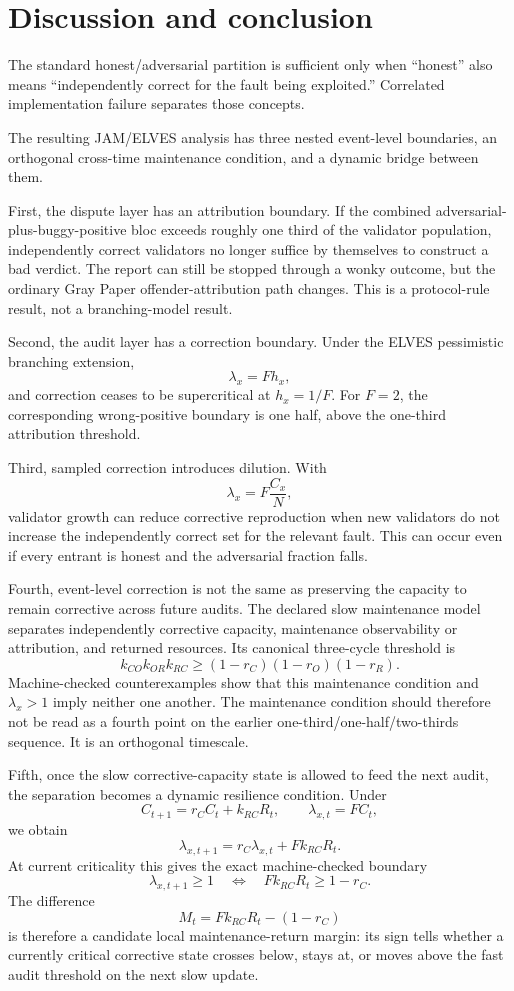 \section{Discussion and conclusion}

The standard honest/adversarial partition is sufficient only when ``honest'' also means ``independently correct for the fault being exploited.'' Correlated implementation failure separates those concepts.

The resulting JAM/ELVES analysis has three nested event-level boundaries, an orthogonal cross-time maintenance condition, and a dynamic bridge between them.

First, the dispute layer has an attribution boundary. If the combined adversarial-plus-buggy-positive bloc exceeds roughly one third of the validator population, independently correct validators no longer suffice by themselves to construct a bad verdict. The report can still be stopped through a wonky outcome, but the ordinary Gray Paper offender-attribution path changes. This is a protocol-rule result, not a branching-model result.

Second, the audit layer has a correction boundary. Under the ELVES pessimistic branching extension,
\[
\lambda_x=Fh_x,
\]
and correction ceases to be supercritical at \(h_x=1/F\). For \(F=2\), the corresponding wrong-positive boundary is one half, above the one-third attribution threshold.

Third, sampled correction introduces dilution. With
\[
\lambda_x=F\frac{C_x}{N},
\]
validator growth can reduce corrective reproduction when new validators do not increase the independently correct set for the relevant fault. This can occur even if every entrant is honest and the adversarial fraction falls.

Fourth, event-level correction is not the same as preserving the capacity to remain corrective across future audits. The declared slow maintenance model separates independently corrective capacity, maintenance observability or attribution, and returned resources. Its canonical three-cycle threshold is
\[
k_{CO}k_{OR}k_{RC}\ge(1-r_C)(1-r_O)(1-r_R).
\]
Machine-checked counterexamples show that this maintenance condition and \(\lambda_x>1\) imply neither one another. The maintenance condition should therefore not be read as a fourth point on the earlier one-third/one-half/two-thirds sequence. It is an orthogonal timescale.

Fifth, once the slow corrective-capacity state is allowed to feed the next audit, the separation becomes a dynamic resilience condition. Under
\[
C_{t+1}=r_CC_t+k_{RC}R_t,
\qquad
\lambda_{x,t}=FC_t,
\]
we obtain
\[
\lambda_{x,t+1}=r_C\lambda_{x,t}+Fk_{RC}R_t.
\]
At current criticality this gives the exact machine-checked boundary
\[
\boxed{
\lambda_{x,t+1}\ge1
\quad\Longleftrightarrow\quad
Fk_{RC}R_t\ge1-r_C.
}
\]
The difference
\[
M_t=Fk_{RC}R_t-(1-r_C)
\]
is therefore a candidate local maintenance-return margin: its sign tells whether a currently critical corrective state crosses below, stays at, or moves above the fast audit threshold on the next slow update.


